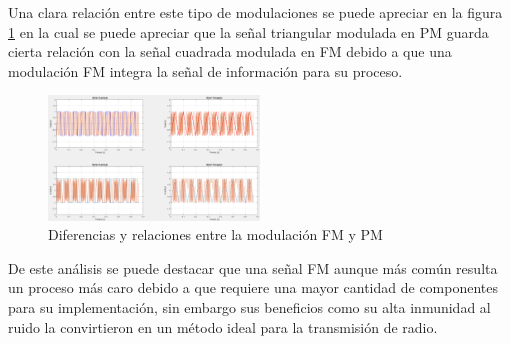 \documentclass[conference]{IEEEtran}
\begin{document}
	Una clara relación entre este tipo de modulaciones se puede apreciar en la figura \ref{fig:relacionpmfm} en la cual se puede apreciar que la señal triangular modulada en PM guarda cierta relación con la señal cuadrada modulada en FM debido a que una modulación FM integra la señal de información para su proceso.

	\begin{figure}[h]
		\centering
		\includegraphics[width=0.5\textwidth]{media/relacion_pm_fm}
		\caption{Diferencias y relaciones entre la modulación FM y PM}
		\label{fig:relacionpmfm}
	\end{figure}
	
	De este análisis se puede destacar que una señal FM aunque más común resulta un proceso más caro debido a que requiere una mayor cantidad de componentes para su implementación, sin embargo sus beneficios como su alta inmunidad al ruido la convirtieron en un método ideal para la transmisión de radio.
	
	
	
\end{document}
